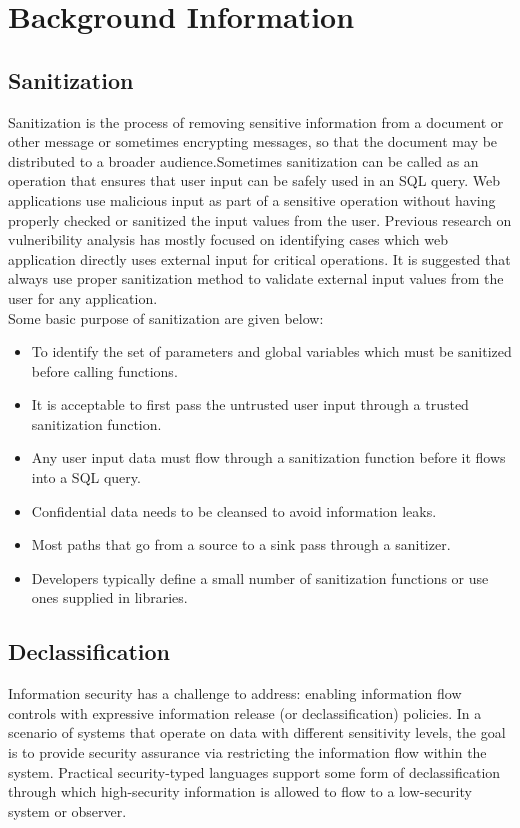 \chapter{Background Information}

\section{Sanitization}
Sanitization is the process of removing sensitive information from a document or other message or sometimes encrypting messages, so that the document may be distributed to a broader audience.Sometimes sanitization can be called as an operation that ensures that user input can be safely used in an SQL query. Web applications use malicious input as part of a sensitive operation without having properly checked or sanitized the input values from the user. Previous research on vulneribility analysis has mostly focused on identifying cases which web application directly uses external input for critical operations. It is suggested that always use proper sanitization method to validate external input values from the user for any application. \\

Some basic purpose of sanitization are given below:
\begin{itemize}
	\item To identify the set of parameters and global variables which must be sanitized before calling functions.
	\item It is acceptable to first pass the untrusted user input through a trusted sanitization function.	
	\item Any user input data must flow through a sanitization function before it flows into a SQL query.
	\item Confidential data needs to be cleansed to avoid information leaks.
	\item Most paths that go from a source to a sink pass through a sanitizer.
	\item Developers typically define a small number of sanitization functions or use ones supplied in libraries.
\end{itemize}

\section{Declassification}
Information security has a challenge to address: enabling information flow controls with expressive information release (or declassification) policies. In a scenario of systems that operate on data with different sensitivity levels, the goal is to provide security assurance via restricting the information flow within the system. Practical security-typed languages support some form of declassification through which high-security information is allowed to flow to a low-security system or observer.\\

